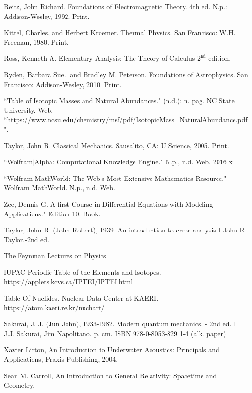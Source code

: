 {\begin{thebibliography}{99}
	
	 Reitz, John Richard. Foundations of Electromagnetic Theory. 4th ed. N.p.: Addison-Wesley, 1992. Print. 
	
	  Kittel, Charles, and Herbert Kroemer. Thermal Physics. San Francisco: W.H. Freeman, 1980. Print.
	
	
	 Ross, Kenneth A. Elementary Analysis: The Theory of Calculus $2^{\textrm{nd}}$ edition. 
	
	 Ryden, Barbara Sue., and Bradley M. Peterson. Foundations of Astrophysics. San Francisco: Addison-Wesley, 2010. Print. 
	
	 ``Table of Isotopic Masses and Natural Abundances." (n.d.): n. pag. NC State University. Web. ``https://www.ncsu.edu/chemistry/msf/pdf/IsotopicMass\_NaturalAbundance.pdf". 
	
	 Taylor, John R. Classical Mechanics. Sausalito, CA: U Science, 2005. Print. 
	
	 ``Wolfram$|$Alpha: Computational Knowledge Engine." N.p., n.d. Web. 2016 x
	
	 ``Wolfram MathWorld: The Web's Most Extensive Mathematics Resource." Wolfram MathWorld. N.p., n.d. Web. 
	
	 Zee, Dennis G. A first Course in Differential Equations with Modeling Applications." Edition 10. Book.
	
	 Taylor, John R. (John Robert), 1939. An introduction to error analysis I John R. Taylor.-2nd ed.
	
	 The Feynman Lectures on Physics

 	 IUPAC Periodic Table of the Elements and Isotopes. https://applets.kcvs.ca/IPTEI/IPTEI.html

  	 Table Of Nuclides.  Nuclear Data Center at KAERI. https://atom.kaeri.re.kr/nuchart/

   	 Sakurai, J. J. (Jun John), 1933-1982. Modern quantum mechanics. - 2nd ed. I J.J. Sakurai, Jim Napolitano. p. cm. ISBN 978-0-8053-829 1-4 (alk. paper)

         Xavier Lirton, An Introduction to Underwater Acoustics: Principals and Applications, Praxis Publishing, 2004.

         Sean M. Carroll, An Introduction to General Relativity: Spacetime and Geometry, 
\end{thebibliography}
}

